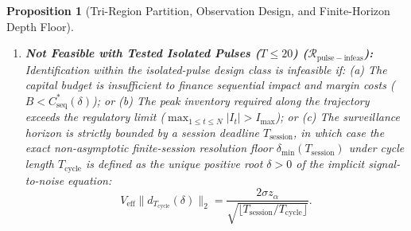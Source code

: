 \documentclass[12pt]{article}
\newtheorem{proposition}[theorem]{Proposition}
\theoremstyle{definition}
\theoremstyle{remark}
\begin{document}
\begin{proposition}[Tri-Region Partition, Observation Design, and Finite-Horizon Depth Floor]
\begin{enumerate}[label=(\roman*)]
Cumulative transaction fees and execution costs scale strictly as $C^*_{\mathrm{seq}}(\delta) = \Theta(\delta^{-4})$ (for Class~II) and $\Theta(\delta^{-2})$ (for Class~I), expanding the required observation horizon to $\Theta(\delta^{-4})$ or $\Theta(\delta^{-2})$. Under the simplified benchmark cost model ($C_{\mathrm{bench}} = \frac{1}{2}\kappa V^2 + \phi P^* |V| = 15.875$ USDT/pulse at $V_{\mathrm{eff}} = 6.25$ BTC), required capital at $\delta = 0.05$ is $4{,}305.25$ USDT under the restricted single-tap design ($T=3$, $N=271$ pulses), but collapses to $193.62$ USDT under the capacity-saturating multi-observation transient design ($T=20$, $N=12$ pulses, $V=6.25$ BTC), or $182.02$ USDT under the exact volume-optimized design ($N=12$, $V^* = 6.057$ BTC), reaching $177.75$ USDT at horizon $T=100$ ($N=11$ pulses; $175.35$ USDT at $V^*=6.207$ BTC). Under the physically executable round-trip unwind model ($C_{\mathrm{exec}} = \kappa V^2 + 2\phi P^* |V| = 31.75$ USDT/pulse), required capital is $8{,}607.38$ USDT ($T=3$), $384.12$ USDT ($T=20$ capacity-saturating), and $360.77$ USDT ($T=20$ volume-optimized). \emph{These figures are costs within the isolated-pulse design class, not minimum capital requirements.} The per-pulse formula charges initial margin once ($3.13$ USDT) and does not track the ledger; twelve buys that are never unwound carry $75$ BTC of inventory and $37.5$ USDT of margin. Section~\ref{ia:account_capital} replaces the formula by an explicit account ledger and shows that a non-pulse probe reaches the same $5\%$ error with about $65$ USDT of account capital.
\item \textbf{Not Feasible with Tested Isolated Pulses ($T \le 20$) ($\mathcal{R}_{\mathrm{pulse-infeas}}$):} Identification within the isolated-pulse design class is infeasible if:
(a) The capital budget is insufficient to finance sequential impact and margin costs ($B < C^*_{\mathrm{seq}}(\delta)$); or
(b) The peak inventory required along the trajectory exceeds the regulatory limit ($\max_{1 \le t \le N} |I_t| > I_{\max}$); or
(c) The surveillance horizon is strictly bounded by a session deadline $T_{\mathrm{session}}$, in which case the exact non-asymptotic finite-session resolution floor $\delta_{\min}(T_{\mathrm{session}})$ under cycle length $T_{\mathrm{cycle}}$ is defined as the unique positive root $\delta > 0$ of the implicit signal-to-noise equation:
\begin{equation}
V_{\mathrm{eff}} \|d_{T_{\mathrm{cycle}}}(\delta)\|_2 = \frac{2 \sigma z_\alpha}{\sqrt{\lfloor T_{\mathrm{session}} / T_{\mathrm{cycle}} \rfloor}}.

\end{equation}
\end{enumerate}
\end{proposition}
\end{document}
